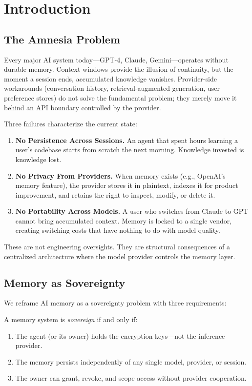 \section{Introduction}

\label{sec:intro}

\subsection{The Amnesia Problem}

Every major AI system today---GPT-4, Claude, Gemini---operates without durable memory. Context windows provide the illusion of continuity, but the moment a session ends, accumulated knowledge vanishes. Provider-side workarounds (conversation history, retrieval-augmented generation, user preference stores) do not solve the fundamental problem; they merely move it behind an API boundary controlled by the provider.

Three failures characterize the current state:

\begin{enumerate}
    \item \textbf{No Persistence Across Sessions.} An agent that spent hours learning a user's codebase starts from scratch the next morning. Knowledge invested is knowledge lost.
    \item \textbf{No Privacy From Providers.} When memory exists (e.g., OpenAI's memory feature), the provider stores it in plaintext, indexes it for product improvement, and retains the right to inspect, modify, or delete it.
    \item \textbf{No Portability Across Models.} A user who switches from Claude to GPT cannot bring accumulated context. Memory is locked to a single vendor, creating switching costs that have nothing to do with model quality.
\end{enumerate}

These are not engineering oversights. They are structural consequences of a centralized architecture where the model provider controls the memory layer.

\subsection{Memory as Sovereignty}

We reframe AI memory as a sovereignty problem with three requirements:

\begin{definition}
A memory system is \emph{sovereign} if and only if:
\begin{enumerate}
    \item The agent (or its owner) holds the encryption keys---not the inference provider.
    \item The memory persists independently of any single model, provider, or session.
    \item The owner can grant, revoke, and scope access without provider cooperation.
\end{enumerate}
\end{definition}

